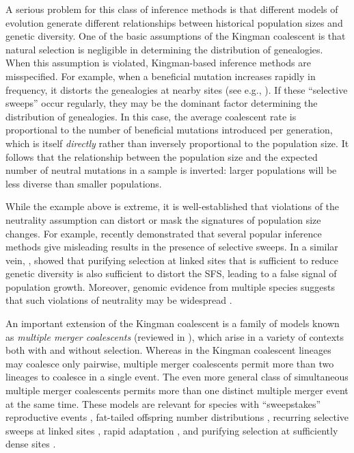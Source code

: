 \documentclass[11pt, letterpaper]{article}   	%
\begin{document}
A serious problem for this class of inference methods is that different models of evolution generate different relationships between historical population sizes and genetic diversity.
One of the basic assumptions of the Kingman coalescent is that natural selection is negligible in determining the distribution of genealogies.
When this assumption is violated, Kingman-based inference methods are misspecified.
For example, when a beneficial mutation increases rapidly in frequency, it distorts the genealogies at nearby sites (see e.g., \cite{CoopRalph2012}).
If these ``selective sweeps'' occur regularly, they may be the dominant factor determining the distribution of genealogies.
In this case, the average coalescent rate is proportional to the number of beneficial mutations introduced per generation, which is itself \emph{directly} rather than inversely proportional to the population size.
It follows that the relationship between the population size and the expected number of neutral mutations in a sample is inverted: larger populations will be less diverse than smaller populations.

While the example above is extreme, it is well-established that violations of the neutrality assumption can distort or mask the signatures of population size changes.
For example, \cite{SchriderEtAl2016} recently demonstrated that several popular inference methods give misleading results in the presence of selective sweeps.
In a similar vein, \cite{CvijovicEtAl2018}, showed that purifying selection at linked sites that is sufficient to reduce genetic diversity is also sufficient to distort the SFS, leading to a false signal of population growth.
Moreover, genomic evidence from multiple species suggests that such violations of neutrality may be widespread \autocite{SellaEtAl2009, Corbett-DetigEtAl2015, KernHahn2018}.

An important extension of the Kingman coalescent is a family of models known as \textit{multiple merger coalescents} \autocite{Pitman1999, Sagitov1999, DonnellyKurtz1999,} (reviewed in \cite{Eldon2016}), which arise in a variety of contexts both with and without selection.
Whereas in the Kingman coalescent lineages may coalesce only pairwise, multiple merger coalescents permit more than two lineages to coalesce in a single event.
The even more general class of simultaneous multiple merger coalescents \autocite{Schweinsberg2000, MohleSagitov2001, Sagitov2003} permits more than one distinct multiple merger event at the same time.
These models are relevant for species with
``sweepstakes'' reproductive events \autocite{EldonWakeley2006, SargsyanWakeley2008},
fat-tailed offspring number distributions \autocite{Schweinsberg2003},
recurring selective sweeps at linked sites \autocite{DurrettSchweinsberg2005, CoopRalph2012},
rapid adaptation \autocite{NeherHallatscheck2013, DesaiEtAl},
and purifying selection at sufficiently dense sites \autocite{Seger, Good, Nicholaisen}.
\end{document}
